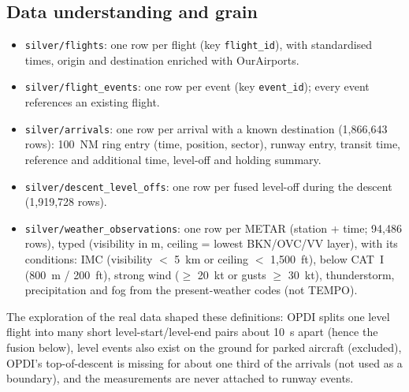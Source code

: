 \documentclass[11pt,a4paper]{article}
\begin{document}
\subsection{Data understanding and grain}
\begin{itemize}[noitemsep,topsep=2pt]
    \item \texttt{silver/flights}: one row per flight (key \texttt{flight\_id}), with standardised times, origin and destination enriched with OurAirports.
    \item \texttt{silver/flight\_events}: one row per event (key \texttt{event\_id}); every event references an existing flight.
    \item \texttt{silver/arrivals}: one row per arrival with a known destination (1,866,643 rows): 100~NM ring entry (time, position, sector), runway entry, transit time, reference and additional time, level-off and holding summary.
    \item \texttt{silver/descent\_level\_offs}: one row per fused level-off during the descent (1,919,728 rows).
    \item \texttt{silver/weather\_observations}: one row per METAR (station + time; 94,486 rows), typed (visibility in m, ceiling = lowest BKN/OVC/VV layer), with its conditions: IMC (visibility $<$ 5~km or ceiling $<$ 1,500~ft), below CAT~I (800~m / 200~ft), strong wind ($\ge$ 20~kt or gusts $\ge$ 30~kt), thunderstorm, precipitation and fog from the present-weather codes (not TEMPO).
\end{itemize}
The exploration of the real data shaped these definitions: OPDI splits one level flight into many short level-start/level-end pairs about 10~s apart (hence the fusion below), level events also exist on the ground for parked aircraft (excluded), OPDI's top-of-descent is missing for about one third of the arrivals (not used as a boundary), and the measurements are never attached to runway events.
\end{document}
